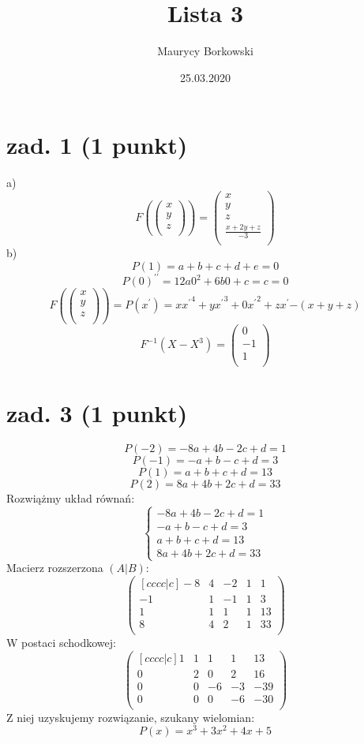 \documentclass{article}
\title{Lista 3}
\date{25.03.2020}
\author{Maurycy Borkowski}
\begin{document}
\maketitle

\section{zad. 1 (1 punkt)}
a)$$ F\left(\begin{pmatrix}
            x\\
            y\\
            z\\
           \end{pmatrix}\right)
        =
            \begin{pmatrix}
            x\\
            y\\
            z\\
            \frac{x+2y+z}{-3}\\
           \end{pmatrix}
$$
b)$$P(1) = a + b + c + d + e = 0$$
$$P(0)^{\prime\prime} = 12a0^2 + 6b0 + c = c = 0$$
$$F\left(\begin{pmatrix}
            x\\
            y\\
            z\\
           \end{pmatrix}\right)
        = P(x^{\prime}) = x{x^{\prime}}^4 + y{x^{\prime}}^3 + 0{x^{\prime}}^2 + z{x^{\prime}} {-(x+y+z)}$$
$$F^{-1}(X-X^3) = \begin{pmatrix}
            0\\
            -1\\
            1\\
           \end{pmatrix}$$
\section{zad. 3 (1 punkt)}
$$P(-2) =-8a+4b-2c+d=1$$
$$P(-1) =-a+b-c+d=3$$
$$P(1) =a+b+c+d=13 $$
$$P(2) =8a+4b+2c+d=33$$
Rozwiążmy układ równań:
$$\begin{cases} -8a+4b-2c+d=1 \\ -a+b-c+d=3 \\ a+b+c+d=13 \\8a+4b+2c+d=33 \end{cases}$$
Macierz rozszerzona $(A|B)$:
$$
\begin{pmatrix}[cccc|c]
-8 & 4 & -2 & 1 & 1 \\
-1 & 1 & -1 & 1 & 3 \\
1 & 1 & 1 & 1 & 13 \\
8 & 4 & 2 & 1 & 33 \\
\end{pmatrix}
$$
W postaci schodkowej:
$$
\begin{pmatrix}[cccc|c]
1 & 1 & 1 & 1 & 13 \\
0 & 2 & 0 & 2 & 16 \\
0 & 0 & -6 & -3 & -39 \\
0 & 0 & 0 & -6 & -30 \\
\end{pmatrix}
$$
Z niej uzyskujemy rozwiązanie, szukany wielomian:
$$P(x) = x^3 + 3x^2 + 4x + 5$$
\end{document}
